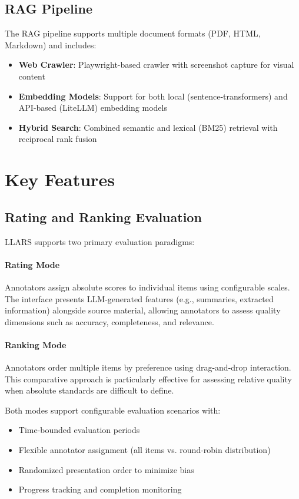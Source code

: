 \documentclass[11pt]{article}
\begin{document}
\subsection{RAG Pipeline}

The RAG pipeline supports multiple document formats (PDF, HTML, Markdown) and includes:

\begin{itemize}
    \item \textbf{Web Crawler}: Playwright-based crawler with screenshot capture for visual content
    \item \textbf{Embedding Models}: Support for both local (sentence-transformers) and API-based (LiteLLM) embedding models
    \item \textbf{Hybrid Search}: Combined semantic and lexical (BM25) retrieval with reciprocal rank fusion
\end{itemize}

\section{Key Features}

\subsection{Rating and Ranking Evaluation}

LLARS supports two primary evaluation paradigms:

\paragraph{Rating Mode}
Annotators assign absolute scores to individual items using configurable scales.
The interface presents LLM-generated features (e.g., summaries, extracted information) alongside source material, allowing annotators to assess quality dimensions such as accuracy, completeness, and relevance.

\paragraph{Ranking Mode}
Annotators order multiple items by preference using drag-and-drop interaction.
This comparative approach is particularly effective for assessing relative quality when absolute standards are difficult to define.

Both modes support configurable evaluation scenarios with:
\begin{itemize}
    \item Time-bounded evaluation periods
    \item Flexible annotator assignment (all items vs. round-robin distribution)
    \item Randomized presentation order to minimize bias
    \item Progress tracking and completion monitoring
\end{itemize}
\end{document}
